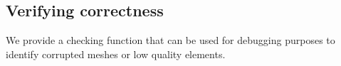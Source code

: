 \subsection{Verifying correctness}
We provide a checking function that can be used for debugging purposes to identify corrupted meshes or low quality elements.

